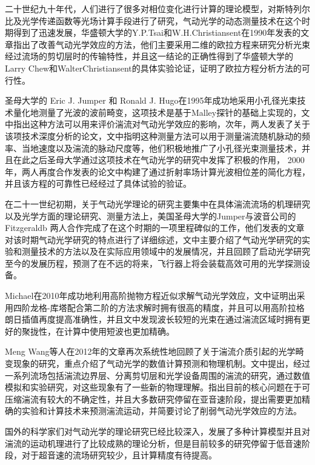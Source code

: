二十世纪九十年代，人们进行了很多对相位变化进行计算的理论模型，对斯特列尔比及光学传递函数等光场计算手段进行了研究，气动光学的动态测量技术在这个时期得到了迅速发展，华盛顿大学的Y.P.Tsai和W.H.Christiansent在1990年发表的文章指出了改善气动光学效应的方法，他们主要采用二维的欧拉方程来研究分析光束经过流场的剪切层时的传输特性\cite{tsai1990}，并且这一结论的正确性得到了华盛顿大学的Larry Chew和WalterChristiansent的具体实验论证\cite{larry1990}，证明了欧拉方程分析方法的可行性。

圣母大学的 Eric J. Jumper 和 Ronald J. Hugo在1995年成功地采用小孔径光束技术量化地测量了光波的波前畸变，这项技术是基于Malley探针的基础上实现的，文中指出这种方法可以用来评价湍流对气动光学效应的影响\cite{jumper1995}，次年，两人发表了关于该项技术深度分析的论文\cite{hugo1996}，文中指明这种测量方法可以用于测量湍流随机脉动的频率、当地速度以及湍流的脉动尺度等，他们积极地推广了小孔径光束测量技术，并且在此之后圣母大学通过这项技术在气动光学的研究中发挥了积极的作用， 2000年，两人再度合作发表的论文中构建了通过折射率场计算光波相位差的简化方程，并且该方程的可靠性已经经过了具体试验的验证\cite{hugo2000}。

在二十一世纪初期，关于气动光学理论的研究主要集中在具体湍流流场的机理研究以及光学方面的理论研究、测量方法上，美国圣母大学的Jumper与波音公司的Fitzgeraldb 两人合作完成了在这个时期的一项里程碑似的工作，他们发表的文章\cite{jumper2001}对该时期气动光学研究的特点进行了详细综述，文中主要介绍了气动光学研究的实验和测量技术的方法以及在实际应用领域中的发展情况，并且回顾了启动光学研究至今的发展历程，预测了在不远的将来，飞行器上将会装载高效可用的光学探测设备。 

Michael在2010年成功地利用高阶抛物方程近似求解气动光学效应，文中证明出采用四阶龙格-库塔配合第二阶的方法求解时拥有很高的精度，并且可以用高阶拉格朗日插值再度提高准确性\cite{michael2010}，并且文中发现波长较短的光束在通过湍流区域时拥有更好的聚拢性，在计算中使用短波也更加精确。

Meng Wang等人在2012年的文章再次系统性地回顾了关于湍流介质引起的光学畸变现象的研究，重点介绍了气动光学的数值计算预测和物理机制\cite{meng2012}。文中提出，经过一系列流场包括湍流边界层、分离剪切层和光学设备周围的湍流的研究，通过数值模拟和实验研究，对这些现象有了一些新的物理理解。指出目前的核心问题在于可压缩湍流有较大的不确定性，并且大多数研究停留在亚音速阶段，提出需要更加精确的实验和计算技术来预测湍流运动，并简要讨论了削弱气动光学效应的方法。

国外的科学家们对气动光学的理论研究已经比较深入，发展了多种计算模型并且对湍流的运动机理进行了比较成熟的理论分析，但是目前较多的研究停留于低音速阶段，对于超音速的流场研究较少，且计算精度有待提高。
